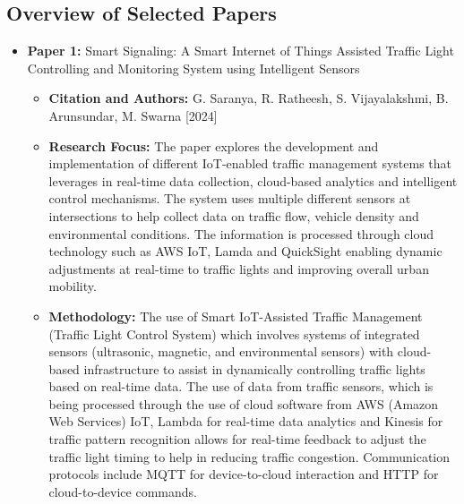 \documentclass[12pt,a4paper]{article}
\begin{document}
\subsection{Overview of Selected Papers}
\begin{itemize}
    \item \textbf{Paper 1:} Smart Signaling: A Smart Internet of Things Assisted Traffic Light Controlling and Monitoring System using Intelligent Sensors 
    
    \begin{itemize}
        \item \textbf{Citation and Authors:}  G. Saranya, R. Ratheesh, S. Vijayalakshmi, B. Arunsundar, M. Swarna [2024]	 
        \item \textbf{Research Focus:} The paper explores the development and implementation of different IoT-enabled traffic management systems that leverages in real-time data collection, cloud-based analytics and intelligent control mechanisms. The system uses multiple different sensors at intersections to help collect data on traffic flow, vehicle density and environmental conditions. The information is processed through cloud technology such as AWS IoT, Lamda and QuickSight enabling dynamic adjustments at real-time to traffic lights and improving overall urban mobility. 
        \item \textbf{Methodology:} The use of Smart IoT-Assisted Traffic Management (Traffic Light Control System) which involves systems of integrated sensors (ultrasonic, magnetic, and environmental sensors) with cloud-based infrastructure to assist in dynamically controlling traffic lights based on real-time data. The use of data from traffic sensors, which is being processed through the use of cloud software from AWS (Amazon Web Services) IoT, Lambda for real-time data analytics and Kinesis for traffic pattern recognition allows for real-time feedback to adjust the traffic light timing to help in reducing traffic congestion. Communication protocols include MQTT for device-to-cloud interaction and HTTP for cloud-to-device commands.
        

\end{itemize}
\end{itemize}
\end{document}
